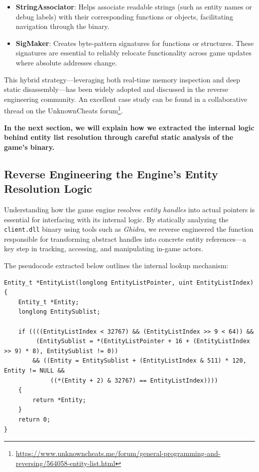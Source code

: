 \begin{tcolorbox}[colback=gray!03, colframe=black!15, sharp corners, boxrule=0.3mm, width=\textwidth]
\begin{itemize}
        \item \textbf{StringAssociator}:  
        Helps associate readable strings (such as entity names or debug labels) with their corresponding functions or objects, facilitating navigation through the binary.
    
        \item \textbf{SigMaker}:  
        Creates byte-pattern signatures for functions or structures. These signatures are essential to reliably relocate functionality across game updates where absolute addresses change.
    \end{itemize}
    
    \vspace{0.4cm}
    
    This hybrid strategy—leveraging both real-time memory inspection and deep static disassembly—has been widely adopted and discussed in the reverse engineering community.  
    An excellent case study can be found in a collaborative thread on the UnknownCheats forum\footnote{\url{https://www.unknowncheats.me/forum/general-programming-and-reversing/564058-entity-list.html}}.
    
    \vspace{0.4cm}
    
    \noindent\textbf{In the next section, we will explain how we extracted the internal logic behind entity list resolution through careful static analysis of the game’s binary.}
    
\end{tcolorbox}

\newpage
\subsection{Reverse Engineering the Engine's Entity Resolution Logic}

Understanding how the game engine resolves \textit{entity handles} into actual pointers is essential for interfacing with its internal logic.  
By statically analyzing the \texttt{client.dll} binary using tools such as \textit{Ghidra}, we reverse engineered the function responsible for transforming abstract handles into concrete entity references—a key step in tracking, accessing, and manipulating in-game actors.

The pseudocode extracted below outlines the internal lookup mechanism:

\begin{lstlisting}[style=cppstyle, caption={Entity Handle Resolution Logic}]
Entity_t *EntityList(longlong EntityListPointer, uint EntityListIndex)
{
    Entity_t *Entity;
    longlong EntitySublist;

    if ((((EntityListIndex < 32767) && (EntityListIndex >> 9 < 64)) &&
         (EntitySublist = *(EntityListPointer + 16 + (EntityListIndex >> 9) * 8), EntitySublist != 0))
        && ((Entity = EntitySublist + (EntityListIndex & 511) * 120, Entity != NULL &&
             ((*(Entity + 2) & 32767) == EntityListIndex))))
    {
        return *Entity;
    }
    return 0;
}   
\end{lstlisting}

